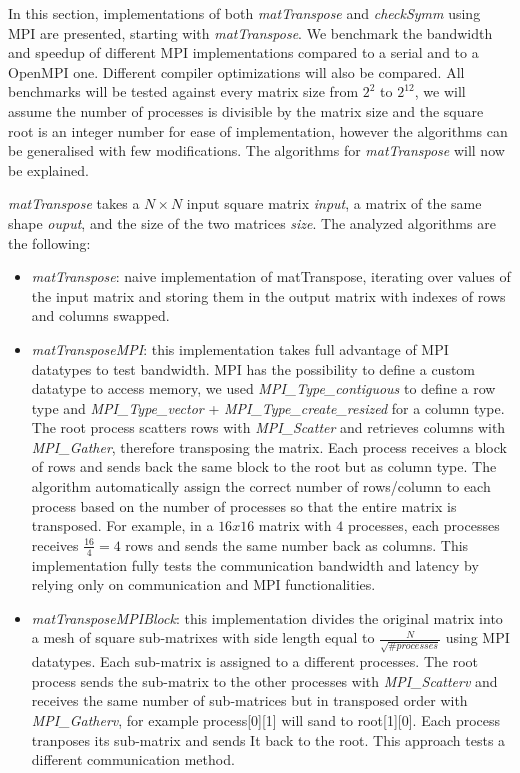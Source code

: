 \documentclass[conference]{IEEEtran}
\begin{document}
In this section, implementations of both \textit{matTranspose}
and \textit{checkSymm} using MPI are presented, starting with
\textit{matTranspose}. We benchmark the bandwidth and speedup
of different MPI implementations compared to a serial and to a OpenMPI one.
Different compiler optimizations will also be compared. All benchmarks
will be tested against every matrix size from $2^2$ to $2^{12}$,
we will assume the number of processes is divisible by the matrix size
and the square root is an integer number for ease of implementation,
however the algorithms can be generalised with few modifications.
The algorithms for \textit{matTranspose} will now be explained.

\textit{matTranspose} takes a $N \times N$ input square matrix
\textit{input}, a matrix of the same shape \textit{ouput}, and the
size of the two matrices \textit{size}. The analyzed algorithms are the following:
\begin{itemize}
\item \textit{matTranspose}: naive implementation of matTranspose, iterating over values of the input matrix and storing them in the output matrix with indexes of rows and columns swapped.
\item \textit{matTransposeMPI}: this implementation takes full advantage
  of MPI datatypes to test bandwidth. MPI has the possibility to define a
  custom datatype to access memory, we used \textit{MPI\_Type\_contiguous}
  to define a row type and \textit{MPI\_Type\_vector} + \textit{MPI\_Type\_create\_resized}
  for a column type. The root process scatters rows with \textit{MPI\_Scatter} and
  retrieves columns with \textit{MPI\_Gather}, therefore
  transposing the matrix. Each process receives a block of rows and
  sends back the same block to the root but as column type. The algorithm
  automatically assign the correct number of rows/column to each process based on the
  number of processes so that the entire matrix is transposed.
  For example, in a $16x16$ matrix with $4$ processes, each processes
  receives $\frac{16}{4}=4$ rows and sends the same number back as
  columns.
  This implementation fully tests the communication
  bandwidth and latency by relying only on communication and MPI
  functionalities.
\item \textit{matTransposeMPIBlock}: this implementation divides the
  original matrix into a mesh of square sub-matrixes with side length equal to
  $\frac{N}{\sqrt{\#processes}}$ using MPI datatypes. Each sub-matrix is assigned
  to a different processes. The root process sends the sub-matrix to the
  other processes with \textit{MPI\_Scatterv} and receives the same
  number of sub-matrices but in transposed order with \textit{MPI\_Gatherv},
  for example process[0][1] will sand to root[1][0].
  Each process tranposes its sub-matrix and sends It back to the root.
  This approach tests a different communication method.
\end{itemize}
\end{document}
